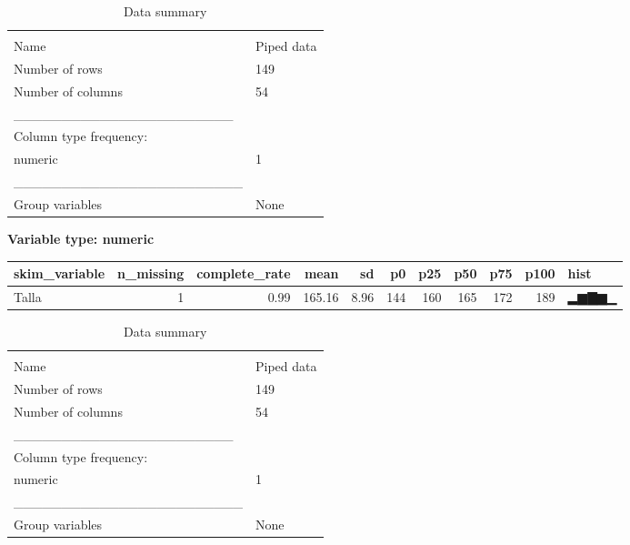 \documentclass[
]{article}
\newenvironment{Shaded}{\begin{snugshade}}{\end{snugshade}}
\newcommand{\DocumentationTok}[1]{\textcolor[rgb]{0.56,0.35,0.01}{\textbf{\textit{#1}}}}
\newcommand{\FunctionTok}[1]{\textcolor[rgb]{0.00,0.00,0.00}{#1}}
\newcommand{\NormalTok}[1]{#1}
\newcommand{\OtherTok}[1]{\textcolor[rgb]{0.56,0.35,0.01}{#1}}
\newcommand{\SpecialCharTok}[1]{\textcolor[rgb]{0.00,0.00,0.00}{#1}}
\begin{document}
\begin{longtable}[]{@{}ll@{}}
\caption{Data summary}\tabularnewline
\toprule
& \\
\midrule
\endfirsthead
\toprule
& \\
\midrule
\endhead
Name & Piped data \\
Number of rows & 149 \\
Number of columns & 54 \\
\_\_\_\_\_\_\_\_\_\_\_\_\_\_\_\_\_\_\_\_\_\_\_ & \\
Column type frequency: & \\
numeric & 1 \\
\_\_\_\_\_\_\_\_\_\_\_\_\_\_\_\_\_\_\_\_\_\_\_\_ & \\
Group variables & None \\
\bottomrule
\end{longtable}

\textbf{Variable type: numeric}

\begin{longtable}[]{@{}lrrrrrrrrrl@{}}
\toprule
skim\_variable & n\_missing & complete\_rate & mean & sd & p0 & p25 &
p50 & p75 & p100 & hist \\
\midrule
\endhead
Talla & 1 & 0.99 & 165.16 & 8.96 & 144 & 160 & 165 & 172 & 189 &
▂▆▇▆▁ \\
\bottomrule
\end{longtable}

\begin{Shaded}
\end{Shaded}

\begin{longtable}[]{@{}ll@{}}
\caption{Data summary}\tabularnewline
\toprule
& \\
\midrule
\endfirsthead
\toprule
& \\
\midrule
\endhead
Name & Piped data \\
Number of rows & 149 \\
Number of columns & 54 \\
\_\_\_\_\_\_\_\_\_\_\_\_\_\_\_\_\_\_\_\_\_\_\_ & \\
Column type frequency: & \\
numeric & 1 \\
\_\_\_\_\_\_\_\_\_\_\_\_\_\_\_\_\_\_\_\_\_\_\_\_ & \\
Group variables & None \\
\bottomrule
\end{longtable}
\end{document}
